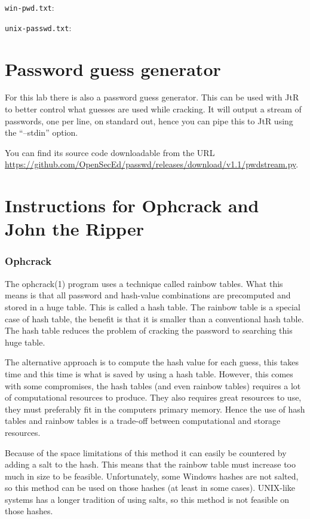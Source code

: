 \verb'win-pwd.txt':


\verb'unix-passwd.txt':



\section{Password guess generator}%
\label{sec:pwdstream}

For this lab there is also a password guess generator.
This can be used with \ac{JtR} to better control what guesses are used while 
cracking.
It will output a stream of passwords, one per line, on standard out, hence you 
can pipe this to \ac{JtR} using the \enquote{--stdin} option.

You can find its source code downloadable from the URL
\url{https://github.com/OpenSecEd/passwd/releases/download/v1.1/pwdstream.py}.

%


\section{Instructions for Ophcrack and John the Ripper}

\subsubsection{Ophcrack}

The ophcrack(1) program uses a technique called rainbow tables.
What this means is that all password and hash-value combinations are 
precomputed and stored in a huge table.
This is called a hash table.
The rainbow table is a special case of hash table, the benefit is that it is 
smaller than a conventional hash table.
The hash table reduces the problem of cracking the password to searching this 
huge table.

The alternative approach is to compute the hash value for each guess, this 
takes time and this time is what is saved by using a hash table.
However, this comes with some compromises, the hash tables (and even rainbow 
tables) requires a lot of computational resources to produce.
They also requires great resources to use, they must preferably fit in the 
computers primary memory.
Hence the use of hash tables and rainbow tables is a trade-off between 
computational and storage resources.

Because of the space limitations of this method it can easily be countered by 
adding a salt to the hash.
This means that the rainbow table must increase too much in size to be 
feasible.
Unfortunately, some Windows hashes are not salted, so this method can be used 
on those hashes (at least in some cases).
UNIX-like systems has a longer tradition of using salts, so this method is not 
feasible on those hashes.

